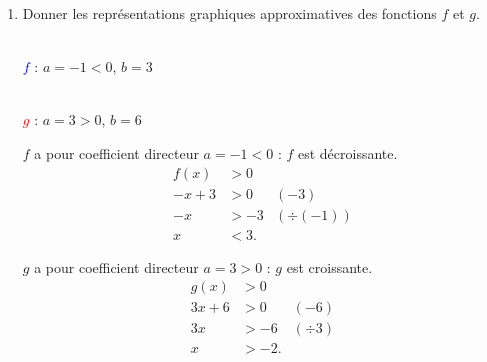 \documentclass[10pt,a4paper]{article}
\begin{document}
\begin{enumerate}
\item Donner les représentations graphiques approximatives des fonctions \(f\) et \(g\).

\begin{center}
\begin{minipage}{2.6cm}
\centering
{}\\[2pt]
{\scriptsize \textcolor{blue}{\(f\)} : \(a=-1<0\), \(b=3\)}
\end{minipage}
\hspace{0.3cm}
\begin{minipage}{2.6cm}
\centering
{}\\[2pt]
{\scriptsize \textcolor{red}{\(g\)} : \(a=3>0\), \(b=6\)}
\end{minipage}
\end{center}

\begin{center}
\begin{minipage}{0.48\linewidth}
\(f\) a pour coefficient directeur \(a=-1<0\) : \(f\) est décroissante.
\[
\begin{aligned}
f(x)&>0\\
-x+3&>0 &\scriptstyle(-3)\\
-x&>-3 &\scriptstyle(\div(-1))\\
x&<3.
\end{aligned}
\]
\end{minipage}
\hfill
\begin{minipage}{0.48\linewidth}
\(g\) a pour coefficient directeur \(a=3>0\) : \(g\) est croissante.
\[
\begin{aligned}
g(x)&>0\\
3x+6&>0 &\scriptstyle(-6)\\
3x&>-6 &\scriptstyle(\div 3)\\
x&>-2.
\end{aligned}
\]
\end{minipage}
\end{center}


\end{enumerate}
\end{document}
